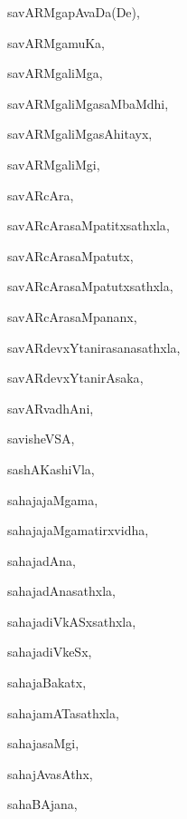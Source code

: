 \begin{multicols}{3}
{\noindent
{savARMgapAvaDa(De)}, \pageref{savARMgapAvaDaDe}

\noindent
{savARMgamuKa}, \pageref{savARMgamuKa}

\noindent
{savARMgaliMga}, \pageref{savARMgaliMga}

\noindent
{savARMgaliMgasaMbaMdhi}, \pageref{savARMgaliMgasaMbaMdhi}

\noindent
{savARMgaliMgasAhitayx}, \pageref{savARMgaliMgasAhitayx}

\noindent
{savARMgaliMgi}, \pageref{savARMgaliMgi}

\noindent
{savARcAra}, \pageref{savARcAra}

\noindent
{savARcArasaMpatitxsathxla}, \pageref{savARcArasaMpatitxsathxla}

\noindent
{savARcArasaMpatutx}, \pageref{savARcArasaMpatutx}

\noindent
{savARcArasaMpatutxsathxla}, \pageref{savARcArasaMpatutxsathxla}

\noindent
{savARcArasaMpananx}, \pageref{savARcArasaMpananx}

\noindent
{savARdevxYtanirasanasathxla}, \pageref{savARdevxYtanirasanasathxla}

\noindent
{savARdevxYtanirAsaka}, \pageref{savARdevxYtanirAsaka}

\noindent
{savARvadhAni}, \pageref{savARvadhAni}

\noindent
{savisheVSA}, \pageref{savisheVSA}

\noindent
{sashAKashiVla}, \pageref{sashAKashiVla}

\noindent
{sahajajaMgama}, \pageref{sahajajaMgama}

\noindent
{sahajajaMgamatirxvidha}, \pageref{sahajajaMgamatirxvidha}

\noindent
{sahajadAna}, \pageref{sahajadAna}

\noindent
{sahajadAnasathxla}, \pageref{sahajadAnasathxla}

\noindent
{sahajadiVkASxsathxla}, \pageref{sahajadiVkASxsathxla}

\noindent
{sahajadiVkeSx}, \pageref{sahajadiVkeSx}

\noindent
{sahajaBakatx}, \pageref{sahajaBakatx}

\noindent
{sahajamATasathxla}, \pageref{sahajamATasathxla}

\noindent
{sahajasaMgi}, \pageref{sahajasaMgi}

\noindent
{sahajAvasAthx}, \pageref{sahajAvasAthx}

\noindent
{sahaBAjana}, \pageref{sahaBAjana}

}
\end{multicols}
